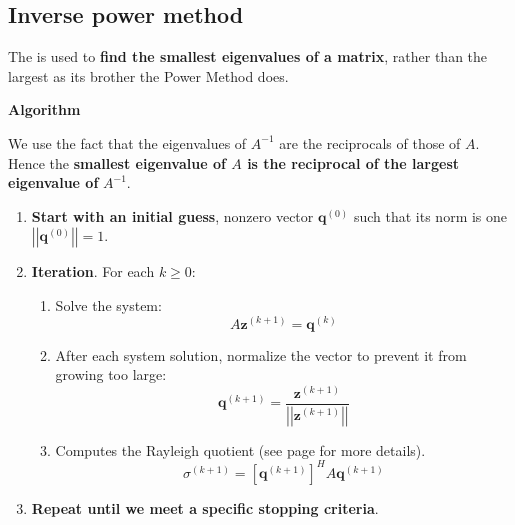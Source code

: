 \subsection{Inverse power method}

The  is used to \textbf{find the smallest eigenvalues of a matrix}, rather than the largest as its brother the Power Method does.

\highspace
\begin{flushleft}
    \textcolor{Green3}{ \textbf{Algorithm}}
\end{flushleft}
We use the fact that the eigenvalues of $A^{-1}$ are the reciprocals of those of $A$. Hence the \textbf{smallest eigenvalue of $A$ is the reciprocal of the largest eigenvalue of} $A^{-1}$.
\begin{enumerate}
    \item \textbf{Start with an initial guess}, nonzero vector $\mathbf{q}^{\left(0\right)}$ such that its norm is one $\left|\left|\mathbf{q}^{\left(0\right)}\right|\right| = 1$.
    \item \textbf{Iteration}. For each $k \ge 0$:
    \begin{enumerate}
        \item Solve the system:
        \begin{equation*}
            A\mathbf{z}^{\left(k+1\right)} = \mathbf{q}^{\left(k\right)}
        \end{equation*}

        \item After each system solution, normalize the vector to prevent it from growing too large:
        \begin{equation*}
            \mathbf{q}^{\left(k+1\right)} = \dfrac{
                \mathbf{z}^{\left(k+1\right)}
            }{
                \left|\left|\mathbf{z}^{\left(k+1\right)}\right|\right|
            }
        \end{equation*}

        \item Computes the Rayleigh quotient (see page \pageref{eq: Rayleigh quotient} for more details).
        \begin{equation*}
            \sigma^{\left(k+1\right)} = \left[\mathbf{q}^{\left(k+1\right)}\right]^{H} A\mathbf{q}^{\left(k+1\right)}
        \end{equation*}
    \end{enumerate}
    \item \textbf{Repeat until we meet a specific stopping criteria}.
\end{enumerate}

